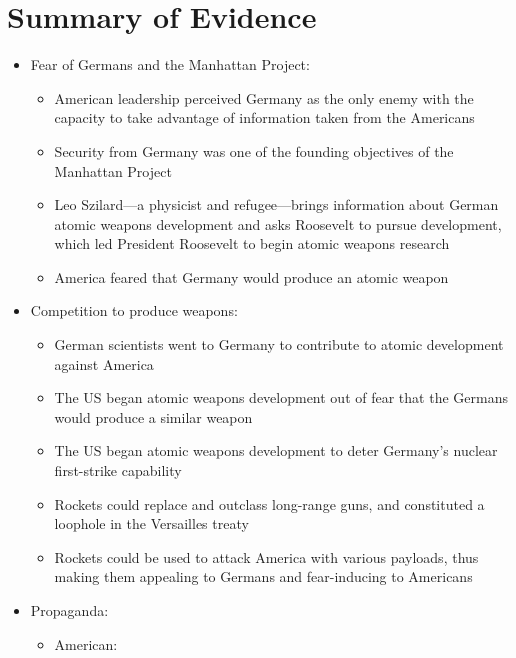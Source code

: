\documentclass[a4paper,12pt]{article}
\begin{document}
    \section{Summary of Evidence}
        \begin{itemize}
            \item Fear of Germans and the Manhattan Project:
            \begin{itemize}
                \item American leadership perceived Germany as the only enemy with the capacity to take advantage of information taken from the Americans \cite[141]{grovesl}
                \item Security from Germany was one of the founding objectives of the Manhattan Project \cite[140]{grovesl}
                \item Leo Szilard---a physicist and refugee---brings information about German atomic weapons development and asks Roosevelt to pursue development, which led President Roosevelt to begin  atomic weapons research \cite[12]{norrism}
                \item America feared that Germany would produce an atomic weapon \cite[136]{stoffm}
            \end{itemize}
            \item Competition to produce weapons:
            \begin{itemize}
                \item German scientists went to Germany to contribute to atomic development against America \cite[6]{powerst}
                \item The US began atomic weapons development out of fear that the Germans would produce a similar weapon \cite[88]{steinbergg}
                \item The US began atomic weapons development to deter Germany's nuclear first-strike capability \cite[89]{steinbergg}
                \item Rockets could replace and outclass long-range guns, and constituted a loophole in the Versailles treaty \cite[2]{neufeldm}
                \item Rockets could be used to attack America with various payloads, thus making them appealing to Germans and fear-inducing to Americans \cite[157]{neufeldm}
            \end{itemize}
            \item Propaganda:
            \begin{itemize}
                \item American:

\end{itemize}
\end{itemize}
\end{document}
